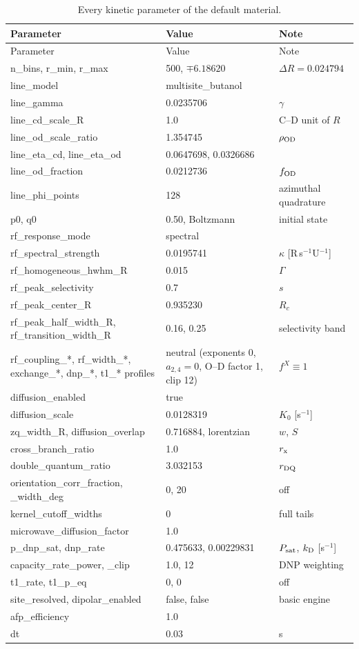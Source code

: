 \documentclass[11pt]{article}
\begin{document}
\begin{longtable}{>{\ttfamily}L{0.36\textwidth} L{0.24\textwidth} L{0.32\textwidth}}
\caption{Every kinetic parameter of the default material.}\label{tab:fullparams}\\
\toprule
Parameter & Value & Note\\
\midrule
\endfirsthead
\toprule
Parameter & Value & Note\\
\midrule
\endhead
n\_bins, r\_min, r\_max & 500, \(\mp6.18620\) & \(\Delta R=0.024794\)\\
line\_model & multisite\_butanol & \\
line\_gamma & 0.0235706 & \(\gamma\)\\
line\_cd\_scale\_R & 1.0 & C--D unit of \(R\)\\
line\_od\_scale\_ratio & 1.354745 & \(\rho_{\rm OD}\)\\
line\_eta\_cd, line\_eta\_od & 0.0647698, 0.0326686 & \\
line\_od\_fraction & 0.0212736 & \(f_{\rm OD}\)\\
line\_phi\_points & 128 & azimuthal quadrature\\
p0, q0 & 0.50, Boltzmann & initial state\\
rf\_response\_mode & spectral & \\
rf\_spectral\_strength & 0.0195741 & \(\kappa\) [R\,s\(^{-1}\)U\(^{-1}\)]\\
rf\_homogeneous\_hwhm\_R & 0.015 & \(\Gamma\)\\
rf\_peak\_selectivity & 0.7 & \(s\)\\
rf\_peak\_center\_R & 0.935230 & \(R_c\)\\
rf\_peak\_half\_width\_R, rf\_transition\_width\_R & 0.16, 0.25 & selectivity band\\
rf\_coupling\_*, rf\_width\_*, exchange\_*, dnp\_*, t1\_* profiles & neutral (exponents 0, \(a_{2,4}=0\), O--D factor 1, clip 12) & \(f^X\equiv1\)\\
diffusion\_enabled & true & \\
diffusion\_scale & 0.0128319 & \(K_0\) [s\(^{-1}\)]\\
zq\_width\_R, diffusion\_overlap & 0.716884, lorentzian & \(w\), \(S\)\\
cross\_branch\_ratio & 1.0 & \(r_{\rm x}\)\\
double\_quantum\_ratio & 3.032153 & \(r_{\rm DQ}\)\\
orientation\_corr\_fraction, \_width\_deg & 0, 20 & off\\
kernel\_cutoff\_widths & 0 & full tails\\
microwave\_diffusion\_factor & 1.0 & \\
p\_dnp\_sat, dnp\_rate & 0.475633, 0.00229831 & \(P_{\rm sat}\), \(k_{\rm D}\) [s\(^{-1}\)]\\
capacity\_rate\_power, \_clip & 1.0, 12 & DNP weighting\\
t1\_rate, t1\_p\_eq & 0, 0 & off\\
site\_resolved, dipolar\_enabled & false, false & basic engine\\
afp\_efficiency & 1.0 & \\
dt & 0.03 & s\\
\bottomrule
\end{longtable}
\end{document}
